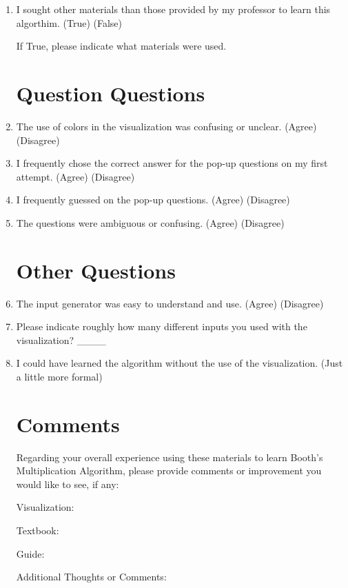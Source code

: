 \documentclass{article}
\begin{document}
\begin{enumerate}
\item I sought other materials than those provided by my professor to learn this algorthim.
(True) (False)

If True, please indicate what materials were used.

\section*{Question Questions}

\item The use of colors in the visualization was confusing or unclear.
(Agree) (Disagree)

\item I frequently chose  the correct answer for the pop-up questions on my first attempt.
(Agree) (Disagree)

\item I frequently guessed on the pop-up questions.
(Agree) (Disagree)

\item The questions were ambiguous or confusing.
(Agree) (Disagree)

\section*{Other Questions}

\item The input generator was easy to understand and use.
(Agree) (Disagree)

\item Please indicate roughly how many different inputs you used with the visualization? \_\_\_\_

\item I could have learned the algorithm without the use of the visualization.
(Just a little more formal)


\section*{Comments}

Regarding your overall experience using these materials to learn Booth's Multiplication Algorithm, please provide comments or improvement you would like to see, if any:

  Visualization:

  Textbook:

  Guide:

  Additional Thoughts or Comments:

\end{enumerate}
\end{document}
